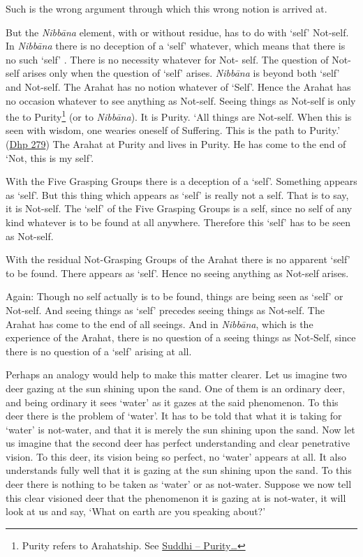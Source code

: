 Such is the wrong argument through which this wrong notion is arrived at.

\enlargethispage{\baselineskip}

But the \emph{Nibbāna} element, with or without residue, has  to do with `self'  Not-self. In \emph{Nibbāna} there is no deception of a `self' whatever, which means that there is no such `self' . There is no necessity whatever for Not- self. The question of Not-self arises only when the question of `self' arises. \emph{Nibbāna} is beyond both `self' and Not-self. The Arahat has no notion whatever of `Self'. Hence the Arahat has no occasion whatever to see anything as Not-self. Seeing things as Not-self is only the  to Purity\footnote{Purity refers to Arahatship. See \protect\hyperlink{suddhi}{Suddhi -- Purity\ldots\hspace{0pt}}} (or to \emph{Nibbāna}). It is  Purity. `All things are Not-self. When this is seen with wisdom, one wearies oneself of Suffering. This is the path to Purity.' (\href{https://suttacentral.net/dhp273-289/en/anandajoti}{Dhp 279}) The Arahat  at Purity and lives in Purity. He has come to the end of `Not, this is my self'.

With the Five Grasping Groups there is a deception of a `self'. Something appears as `self'. But this thing which appears as `self' is really not a self. That is to say, it is Not-self. The `self' of the Five Grasping Groups is  a self, since no self of any kind whatever is to be found at all anywhere. Therefore this `self' has to be seen as Not-self.

With the residual Not-Grasping Groups of the Arahat there is no apparent `self' to be found. There  appears as `self'. Hence no seeing anything as Not-self arises.

Again: Though no self actually is to be found, things are being seen as `self' or Not-self. And seeing things as `self' precedes seeing things as Not-self. The Arahat has come to the end of all seeings. And in \emph{Nibbāna}, which is the experience of the Arahat, there is no question of a seeing things as Not-Self, since there is no question of a `self' arising at all.

Perhaps an analogy would help to make this matter clearer. Let us imagine two deer gazing at the sun shining upon the sand. One of them is an ordinary deer, and being ordinary it sees `water' as it gazes at the said phenomenon. To this deer there is the problem of `water'. It has to be told that what it is taking for `water' is not-water, and that it is merely the sun shining upon the sand. Now let us imagine that the second deer has perfect understanding and clear penetrative vision. To this deer, its vision being so perfect, no `water' appears at all. It also understands fully well that it is gazing at the sun shining upon the sand. To this deer there is nothing to be taken as `water' or as not-water. Suppose we now tell this clear visioned deer that the phenomenon it is gazing at is not-water, it will look at us and say, `What on earth are you speaking about?'

